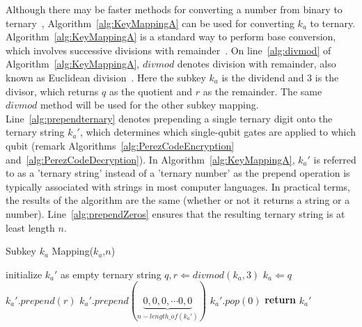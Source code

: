 Although there may be faster methods for converting a number from binary to ternary~\cite{zhang2019efficient}, Algorithm~\ref{alg:KeyMappingA} can be used for converting $k_a$ to ternary. Algorithm~\ref{alg:KeyMappingA} is a standard way to perform base conversion, which involves successive divisions with remainder~\cite{BaseConversionWikipedia}. On line~\ref{alg:divmod} of Algorithm~\ref{alg:KeyMappingA}, $\mathit{divmod}$ denotes division with remainder, also known as Euclidean division~\cite{EuclideanDivisionWiki}. Here the subkey $k_a$ is the dividend and $3$ is the divisor, which returns $q$ as the quotient and $r$ as the remainder. The same $\mathit{divmod}$ method will be used for the other subkey mapping. Line~\ref{alg:prependternary} denotes prepending a single ternary digit onto the ternary string $k_a'$, which determines which single-qubit gates are applied to which qubit (remark Algorithms~\ref{alg:PerezCodeEncryption} and~\ref{alg:PerezCodeDecryption}). In Algorithm~\ref{alg:KeyMappingA}, $k_a'$ is referred to as a 'ternary string' instead of a 'ternary number' as the prepend operation is typically associated with strings in most computer languages. In practical terms, the results of the algorithm are the same (whether or not it returns a string or a number). Line~\ref{alg:prependZeros} ensures that the resulting ternary string is at least length $n$.

\begin{algorithm}[H]
  \caption{Subkey $k_a$ Mapping($k_a$,$n$)}  \label{alg:KeyMappingA}
  \begin{algorithmic}[1]
  \State initialize $k_a'$ as empty ternary string
    \State $q,r \Longleftarrow \mathit{divmod}(k_a,3)$ \label{alg:divmod}
    \State $k_a \Longleftarrow q$
    \State $k_a'.\mathit{prepend}(r)$ \label{alg:prependternary}
  \EndWhile
  \State $k_a'.\mathit{prepend}(\underbrace{0, 0, 0,\cdots 0,0}_{n - \mathit{length\_of}(k_a')})$ \label{alg:prependZeros}
  \State $k_a'.\mathit{pop}(0)$ \label{alg:KeyMappingA:shortenTernaryString}
  \EndIf
  \State \textbf{return} $k_a'$
  \end{algorithmic}
\end{algorithm}

